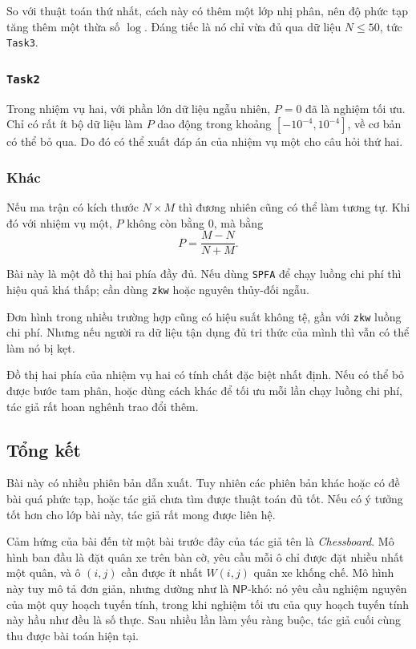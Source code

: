 \documentclass[11pt]{article}
\begin{document}
So với thuật toán thứ nhất, cách này có thêm một lớp nhị phân, nên độ phức tạp
tăng thêm một thừa số \(\log\). Đáng tiếc là nó chỉ vừa đủ qua dữ liệu
\(N\le50\), tức \texttt{Task3}.

\subsubsection{\texttt{Task2}}

Trong nhiệm vụ hai, với phần lớn dữ liệu ngẫu nhiên, \(P=0\) đã là nghiệm tối
ưu. Chỉ có rất ít bộ dữ liệu làm \(P\) dao động trong khoảng
\([-10^{-4},10^{-4}]\), về cơ bản có thể bỏ qua. Do đó có thể xuất đáp án của
nhiệm vụ một cho câu hỏi thứ hai.

\subsubsection{Khác}

Nếu ma trận có kích thước \(N\times M\) thì đương nhiên cũng có thể làm tương tự.
Khi đó với nhiệm vụ một, \(P\) không còn bằng \(0\), mà bằng
\[
  P=\frac{M-N}{N+M}.
\]

Bài này là một đồ thị hai phía đầy đủ. Nếu dùng \texttt{SPFA} để chạy luồng chi
phí thì hiệu quả khá thấp; cần dùng \texttt{zkw} hoặc nguyên thủy-đối ngẫu.

Đơn hình trong nhiều trường hợp cũng có hiệu suất không tệ, gần với
\texttt{zkw} luồng chi phí. Nhưng nếu người ra dữ liệu tận dụng đủ tri thức của
mình thì vẫn có thể làm nó bị kẹt.

Đồ thị hai phía của nhiệm vụ hai có tính chất đặc biệt nhất định. Nếu có thể bỏ
được bước tam phân, hoặc dùng cách khác để tối ưu mỗi lần chạy luồng chi phí,
tác giả rất hoan nghênh trao đổi thêm.

\subsection{Tổng kết}

Bài này có nhiều phiên bản dẫn xuất. Tuy nhiên các phiên bản khác hoặc có đề bài
quá phức tạp, hoặc tác giả chưa tìm được thuật toán đủ tốt. Nếu có ý tưởng tốt
hơn cho lớp bài này, tác giả rất mong được liên hệ.

Cảm hứng của bài đến từ một bài trước đây của tác giả tên là \emph{Chessboard}.
Mô hình ban đầu là đặt quân xe trên bàn cờ, yêu cầu mỗi ô chỉ được đặt nhiều
nhất một quân, và ô \((i,j)\) cần được ít nhất \(W(i,j)\) quân xe khống chế. Mô
hình này tuy mô tả đơn giản, nhưng dường như là \(\mathsf{NP}\)-khó: nó yêu cầu
nghiệm nguyên của một quy hoạch tuyến tính, trong khi nghiệm tối ưu của quy
hoạch tuyến tính này hầu như đều là số thực. Sau nhiều lần làm yếu ràng buộc,
tác giả cuối cùng thu được bài toán hiện tại.
\end{document}
